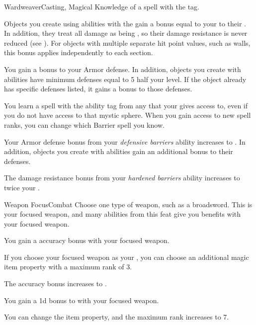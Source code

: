     \begin{magicalfeat}{Wardweaver}{Casting, Magical}
        \featpre Knowledge of a spell with the  tag.

         Objects you create using abilities with the   gain a bonus equal to your  to their .
        In addition, they treat all damage as being , so their damage resistance is never reduced (see ).
        For objects with multiple separate hit point values, such as walls, this bonus applies independently to each section.

         You gain a  bonus to your Armor defense.
        In addition, objects you create with  abilities have minimum defenses equal to 5 \add half your level.
        If the object already has specific defenses listed, it gains a  bonus to those defenses.

         You learn a spell with the  ability tag from any  that your  gives access to, even if you do not have access to that mystic sphere.
        When you gain access to new spell ranks, you can change which Barrier spell you know.

         Your Armor defense bonus from your \textit{defensive barriers} ability increases to .
        In addition, objects you create with  abilities gain an additional  bonus to their defenses.

         The damage resistance bonus from your \textit{hardened barriers} ability increases to twice your .
    \end{magicalfeat}

    \begin{feat}{Weapon Focus}{Combat}
         Choose one type of weapon, such as a broadsword.
        This is your focused weapon, and many abilities from this feat give you benefits with your focused weapon.

         You gain a  accuracy bonus with your focused weapon.

         If you choose your focused weapon as your , you can choose an additional magic item property with a maximum rank of 3.

         The accuracy bonus increases to .

         You gain a \plus1d bonus to  with your focused weapon.

         You can change the item property, and the maximum rank increases to 7.
    \end{feat}

